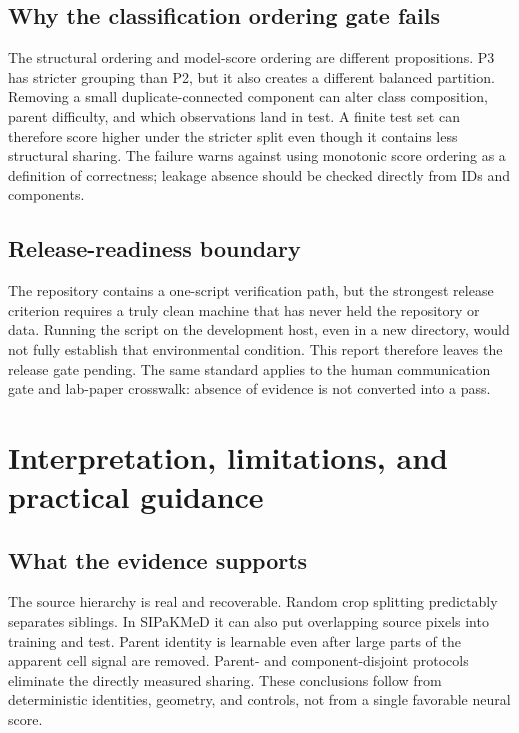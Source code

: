 \documentclass[11pt,oneside]{report}
\newcommand{\protocol}[1]{\textsf{#1}}
\begin{document}
\section{Why the classification ordering gate fails}

The structural ordering and model-score ordering are different propositions. \protocol{P3} has stricter grouping than \protocol{P2}, but it also creates a different balanced partition. Removing a small duplicate-connected component can alter class composition, parent difficulty, and which observations land in test. A finite test set can therefore score higher under the stricter split even though it contains less structural sharing. The failure warns against using monotonic score ordering as a definition of correctness; leakage absence should be checked directly from IDs and components.

\section{Release-readiness boundary}

The repository contains a one-script verification path, but the strongest release criterion requires a truly clean machine that has never held the repository or data. Running the script on the development host, even in a new directory, would not fully establish that environmental condition. This report therefore leaves the release gate pending. The same standard applies to the human communication gate and lab-paper crosswalk: absence of evidence is not converted into a pass.

\chapter{Interpretation, limitations, and practical guidance}

\section{What the evidence supports}

The source hierarchy is real and recoverable. Random crop splitting predictably separates siblings. In SIPaKMeD it can also put overlapping source pixels into training and test. Parent identity is learnable even after large parts of the apparent cell signal are removed. Parent- and component-disjoint protocols eliminate the directly measured sharing. These conclusions follow from deterministic identities, geometry, and controls, not from a single favorable neural score.
\end{document}
